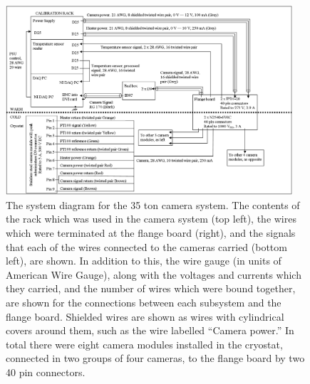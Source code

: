 \begin{figure}
  \centering
  \includegraphics[width=0.95\textwidth]{Camera_Block_diagram}
  \caption[The system diagram for the 35 ton camera system]
          {The system diagram for the 35 ton camera system. The contents of the rack which was used in the camera system (top left), the wires which were terminated at the flange board (right), and the signals that each of the wires connected to the cameras carried (bottom left), are shown. In addition to this, the wire gauge (in units of American Wire Gauge), along with the voltages and currents which they carried, and the number of wires which were bound together, are shown for the connections between each subsystem and the flange board. Shielded wires are shown as wires with cylindrical covers around them, such as the wire labelled ``Camera power.'' In total there were eight camera modules installed in the cryostat, connected in two groups of four cameras, to the flange board by two 40 pin connectors.}
  \label{fig:CamSysDiagram}
\end{figure}

